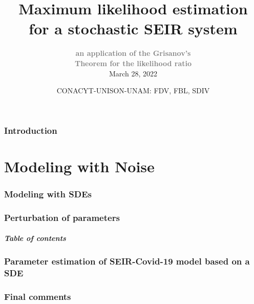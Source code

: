 \documentclass[9pt]{beamer}
\title{\Huge{Maximum likelihood estimation}\\
    \Huge{
        \textbf{
            for a stochastic SEIR system}
    }
}
\subtitle{%
        \textbf{
            \textcolor{gray}{
                 an application of the Grisanov's%
            }
       }
    \\    
    \textbf{    
        \textcolor{gray}{
            Theorem for the likelihood ratio
        }
    }    
    \\
    \normalsize{March 28, 2022}
}
\author{
    \normalsize{%
        CONACYT-UNISON-UNAM: FDV, FBL, SDIV
    }
}
\begin{document}
    \titlepage
         \section*{Introduction}
    \part{Modeling with Noise}
        \section{Modeling with SDEs}
             
        \section{Perturbation of parameters}
             
             
%             
%
%             
%             
        \begin{frame}
            \frametitle{Table of contents}
            \tableofcontents
        \end{frame}
        \section{Parameter estimation of SEIR-Covid-19 model based on a SDE}
	        
            
            
        \section{Final comments}
%            
%        
\end{document}
